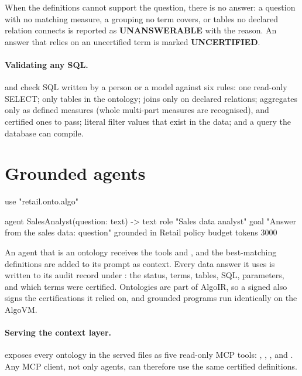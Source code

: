 When the definitions cannot support the question, there is no answer: a question with no matching measure, a grouping no term covers, or tables no declared relation connects is reported as \textbf{UNANSWERABLE} with the reason. An answer that relies on an uncertified term is marked \textbf{UNCERTIFIED}.

\paragraph{Validating any SQL.}  and  check SQL written by a person or a model against six rules: one read-only SELECT; only tables in the ontology; joins only on declared relations; aggregates only as defined measures (whole multi-part measures are recognised), and certified ones to pass; literal filter values that exist in the data; and a query the database can compile.

\section{Grounded agents}

\begin{algo}[title=examples/v13/sales\_analyst.algo (excerpt)]
use "retail.onto.algo"

agent SalesAnalyst(question: text) -> text {
    role "Sales data analyst"
    goal "Answer from the sales data: {question}"
    grounded in Retail
    policy { budget tokens 3000 }
}
\end{algo}

An agent that is  an ontology receives the tools  and , and the best-matching definitions are added to its prompt as context. Every data answer it uses is written to its audit record under : the status, terms, tables, SQL, parameters, and which terms were certified. Ontologies are part of AlgoIR, so a signed  also signs the certifications it relied on, and grounded programs run identically on the AlgoVM.

\paragraph{Serving the context layer.}  exposes every ontology in the served files as five read-only MCP tools: , , ,  and . Any MCP client, not only \algolang{} agents, can therefore use the same certified definitions.
